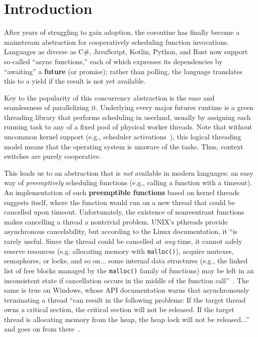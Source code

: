 \section{Introduction}
\label{sec:intro}

After years of struggling to gain adoption, the coroutine has finally become a
mainstream abstraction for cooperatively scheduling function invocations.  Languages
as diverse as C\#, JavaScript, Kotlin, Python, and Rust now support so-called ``async
functions,'' each of which expresses its dependencies by ``awaiting'' a
\textbf{future} (or promise); rather than polling, the language translates this to a
yield if the result is not yet available.

Key to the popularity of this concurrency abstraction is the ease and seamlessness of
parallelizing it.  Underlying every major futures runtime is a green threading
library that performs scheduling in userland, usually by assigning each running task
to any of a fixed pool of physical worker threads.  Note that without uncommon kernel
support (e.g., scheduler activations~\cite{anderson:sosp1991}), this logical
threading model means that the operating system is unaware of the tasks.  Thus,
context switches are purely cooperative.

This leads us to an abstraction that is \textit{not} available in modern languages:\@
an easy way of \textit{preemptively} scheduling functions (e.g., calling a function
with a timeout).  An implementation of such \textbf{preemptible functions} based on
kernel threads suggests itself, where the function would run on a new thread that
could be cancelled upon timeout.  Unfortunately, the existence of nonreentrant
functions makes cancelling a thread a nontrivial problem.  UNIX's pthreads provide
asynchronous cancelability, but according to the Linux documentation, it ``is rarely
useful.  Since the thread could be cancelled at \textit{any} time, it cannot safely
reserve resources (e.g.  allocating memory with \texttt{malloc()}), acquire mutexes,
semaphores, or locks, and so on... some internal data structures (e.g., the linked
list of free blocks managed by the \texttt{malloc()} family of functions) may be left
in an inconsistent state if cancellation occurs in the middle of the function
call''~\cite{pthreadsetcanceltype-manpage}.  The same is true on Windows, whose API
documentation warns that asynchronously terminating a thread ``can result in the
following problems: If the target thread owns a critical section, the critical
section will not be released.  If the target thread is allocating memory from the
heap, the heap lock will not be released...'' and goes on from
there~\cite{www-microsoft-terminatethread}.

